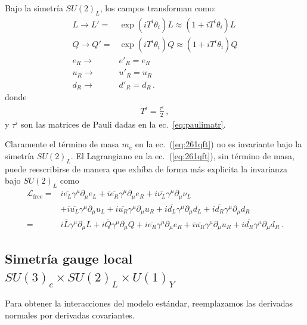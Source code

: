\begin{frame}
Bajo la simetría $SU(2)_L$, los campos transforman como:
 \begin{align}
  L\to L'=&\exp(i T^i \theta_i)L\approx(1+i T^i\theta_i)L\nonumber\\
  Q\to Q'=&\exp(i T^i \theta_i)Q\approx(1+i T^i\theta_i)Q\nonumber\\
  e_R\to& e'_R=e_R\nonumber\\
  u_R\to& u'_R=u_R\nonumber\\
  d_R\to& d'_R=d_R\,.
\end{align}
donde
\begin{align}
  T^i=\frac{\tau^i}{2}\,,
\end{align}
y $\tau^i$ son las matrices de Pauli dadas en la ec.~\eqref{eq:paulimatr}.

Claramente el término de masa $m_e$ en la ec.~(\ref{eq:261qft}) no es invariante bajo la simetría $SU(2)_L$. El Lagrangiano en la ec.~(\ref{eq:261qft}), sin término de masa, puede reescribirse de manera que exhíba de forma más explicita la invarianza bajo $SU(2)_L$ como
\begin{align}
  \mathcal{L}_{\text{free}}
=&i\overline{e_L}\gamma^\mu\partial_\mu e_L+i\overline{e_R}\gamma^\mu\partial_\mu e_R+i\overline{\nu_L}\gamma^\mu\partial_\mu\nu_L\nonumber\\
&+i\overline{u_L}\gamma^\mu\partial_\mu u_L+i\overline{u_R}\gamma^\mu\partial_\mu u_R
+i\overline{d_L}\gamma^\mu\partial_\mu d_L+i\overline{d_R}\gamma^\mu\partial_\mu d_R\nonumber\\
=&i\overline{L}\gamma^\mu\partial_\mu L+i\overline{Q}\gamma^\mu\partial_\mu Q+i\overline{e_R}\gamma^\mu\partial_\mu e_R
+i\overline{u_R}\gamma^\mu\partial_\mu u_R
+i\overline{d_R}\gamma^\mu\partial_\mu d_R\,.
\end{align}


\subsection*{Simetría gauge local $SU(3)_c\times  SU(2)_L\times  U(1)_Y$}

Para obtener la interacciones del modelo estándar, reemplazamos las derivadas normales por derivadas covariantes.


\end{frame}
